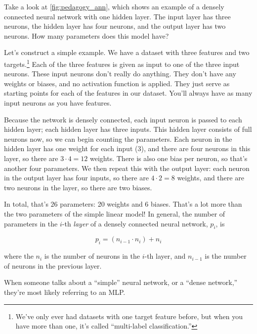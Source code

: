 Take a look at \autoref{fig:pedagogy_ann}, which shows an example of a densely connected neural network with one hidden layer. The input layer has three neurons, the hidden layer has four neurons, and the output layer has two neurons. How many parameters does this model have?

Let's construct a simple example. We have a dataset with three features and two targets.\footnote{We've only ever had datasets with one target feature before, but when you have more than one, it's called ``multi-label classification.''} Each of the three features is given as input to one of the three input neurons. These input neurons don't really do anything. They don't have any weights or biases, and no activation function is applied. They just serve as starting points for each of the features in our dataset. You'll always have as many input neurons as you have features.

Because the network is densely connected, each input neuron is passed to each hidden layer; each hidden layer has three inputs. This hidden layer consists of full neurons now, so we can begin counting the parameters. Each neuron in the hidden layer has one weight for each input ($3$), and there are four neurons in this layer, so there are $3\cdot4=12$ weights. There is also one bias per neuron, so that's another four parameters. We then repeat this with the output layer: each neuron in the output layer has four inputs, so there are $4\cdot2=8$ weights, and there are two neurons in the layer, so there are two biases.

In total, that's $26$ parameters: 20 weights and 6 biases. That's a lot more than the two parameters of the simple linear model! In general, the number of parameters in the $i$-th \textit{layer} of a densely connected neural network, $p_i$, is

\begin{equation}
    p_i=(n_{i-1} \cdot n_i) + n_i
\end{equation}

\noindent where the $n_i$ is the number of neurons in the $i$-th layer, and $n_{i-1}$ is the number of neurons in the previous layer.

When someone talks about a ``simple'' neural network, or a ``dense network,'' they're most likely referring to an MLP.

